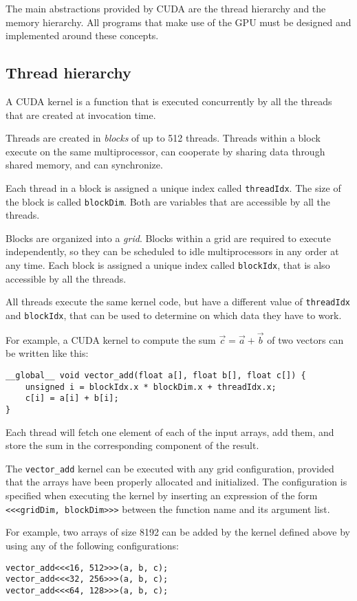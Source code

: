 The main abstractions provided by CUDA
are the thread hierarchy and the memory hierarchy.
All programs that make use of the GPU
must be designed and implemented around these concepts.

\subsection{Thread hierarchy}
\label{sub:thread-hierarchy}

A CUDA kernel is a function
that is executed concurrently
by all the threads that are created
at invocation time.

Threads are created in \emph{blocks}
of up to 512 threads.
Threads within a block
execute on the same multiprocessor,
can cooperate by sharing data through shared memory,
and can synchronize.

Each thread in a block
is assigned a unique index
called \texttt{threadIdx}.
The size of the block
is called \texttt{blockDim}.
Both are variables that are accessible
by all the threads.

Blocks are organized into a \emph{grid}.
Blocks within a grid
are required to execute independently,
so they can be scheduled to idle multiprocessors
in any order at any time.
Each block is assigned a unique index
called \verb+blockIdx+,
that is also accessible by all the threads.

All threads execute the same kernel code,
but have a different value of \verb+threadIdx+ and \verb+blockIdx+,
that can be used to determine on which data they have to work.

For example,
a CUDA kernel to compute the sum \(\vec c = \vec a + \vec b\) of two vectors
can be written like this:
\begin{verbatim}
__global__ void vector_add(float a[], float b[], float c[]) {
    unsigned i = blockIdx.x * blockDim.x + threadIdx.x;
    c[i] = a[i] + b[i];
}
\end{verbatim}
Each thread will fetch one element of each of the input arrays, add them,
and store the sum in the corresponding component of the result.

The \verb+vector_add+ kernel can be executed with any grid configuration,
provided that the arrays have been properly allocated and initialized.
The configuration is specified when executing the kernel
by inserting an expression of the form \texttt{<<<gridDim, blockDim>>>}
between the function name and its argument list.

For example,
two arrays of size 8192 can be added
by the kernel defined above
by using any of the following configurations:
\begin{verbatim}
vector_add<<<16, 512>>>(a, b, c);
vector_add<<<32, 256>>>(a, b, c);
vector_add<<<64, 128>>>(a, b, c);
\end{verbatim}

